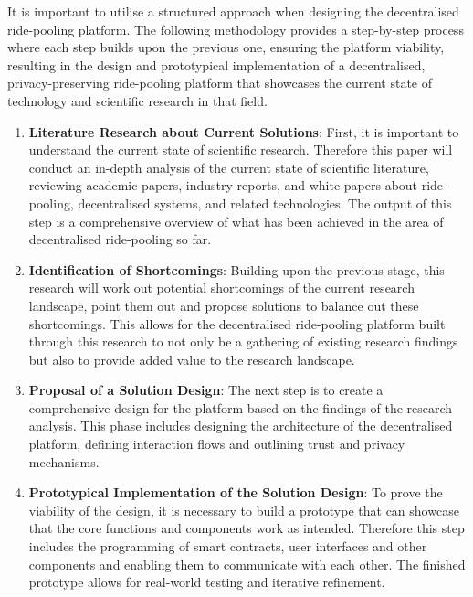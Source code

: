 It is important to utilise a structured approach when designing the decentralised ride-pooling platform. The following methodology provides a step-by-step process where each step builds upon the previous one, ensuring the platform viability, resulting in the design and prototypical implementation of a decentralised, privacy-preserving ride-pooling platform that showcases the current state of technology and scientific research in that field.


\begin{enumerate}

    \item \textbf{Literature Research about Current Solutions}: 
    First, it is important to understand the current state of scientific research. Therefore this paper will conduct an in-depth analysis of the current state of scientific literature, reviewing academic papers, industry reports, and white papers about ride-pooling, decentralised systems, and related technologies. The output of this step is a comprehensive overview of what has been achieved in the area of decentralised ride-pooling so far.

    \item \textbf{Identification of Shortcomings}: 
    Building upon the previous stage, this research will work out potential shortcomings of the current research landscape, point them out and propose solutions to balance out these shortcomings. This allows for the decentralised ride-pooling platform built through this research to not only be a gathering of existing research findings but also to provide added value to the research landscape.

    \item \textbf{Proposal of a Solution Design}:
    The next step is to create a comprehensive design for the platform based on the findings of the research analysis. This phase includes designing the architecture of the decentralised platform, defining interaction flows and outlining trust and privacy mechanisms. 
    

    \item \textbf{Prototypical Implementation of the Solution Design}: 
    To prove the viability of the design, it is necessary to build a prototype that can showcase that the core functions and components work as intended. Therefore this step includes the programming of smart contracts, user interfaces and other components and enabling them to communicate with each other. The finished prototype allows for real-world testing and iterative refinement.


\end{enumerate}
